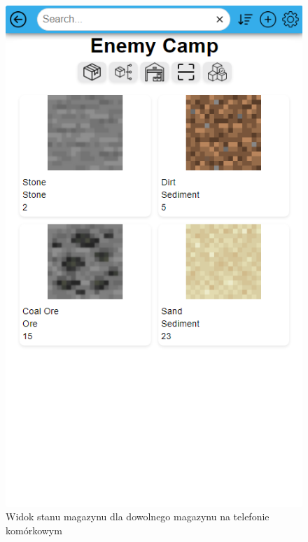 \documentclass[../main.tex]{subfiles}
\begin{document}
            \begin{figure}[H]
                \centering
                \includegraphics[height=\getImageHeight]{images/app-mobile/app-stock-any-mobile.png}
                \caption{Widok stanu magazynu dla dowolnego magazynu na telefonie komórkowym}
                \label{fig:app-stock-any-mobile}
            \end{figure}
\end{document}
